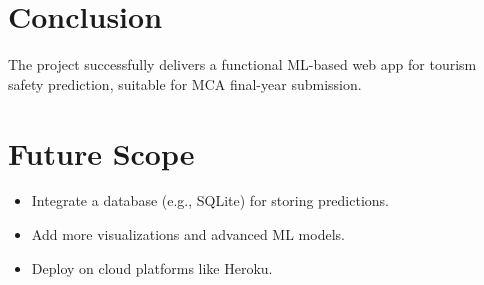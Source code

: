 \documentclass[a4paper,12pt]{article}
\begin{document}
\section{Conclusion}
The project successfully delivers a functional ML-based web app for tourism safety prediction, suitable for MCA final-year submission.

\section{Future Scope}
\begin{itemize}
    \item Integrate a database (e.g., SQLite) for storing predictions.
    \item Add more visualizations and advanced ML models.
    \item Deploy on cloud platforms like Heroku.
\end{itemize}
\end{document}
